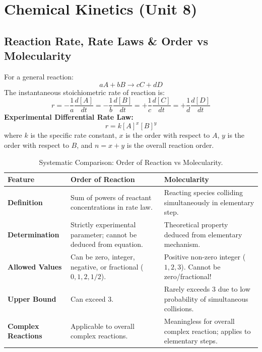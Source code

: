 \documentclass[10pt,twoside,openright]{book}
\begin{document}
\section{Chemical Kinetics (Unit 8)}

\subsection{Reaction Rate, Rate Laws \& Order vs Molecularity}
For a general reaction:
\begin{equation}
  aA + bB \longrightarrow cC + dD
\end{equation}
The instantaneous stoichiometric rate of reaction is:
\begin{equation}
  r = -\frac{1}{a}\frac{d[A]}{dt} = -\frac{1}{b}\frac{d[B]}{dt} = +\frac{1}{c}\frac{d[C]}{dt} = +\frac{1}{d}\frac{d[D]}{dt}
\end{equation}
\textbf{Experimental Differential Rate Law:}
\begin{equation}
  r = k [A]^x [B]^y
\end{equation}
where $k$ is the specific rate constant, $x$ is the order with respect to $A$, $y$ is the order with respect to $B$, and $n = x + y$ is the overall reaction order.

\begin{table}[htbp]
\centering
\footnotesize
\setlength{\tabcolsep}{3pt}
\renewcommand{\arraystretch}{1.2}
\begin{tabularx}{\linewidth}{>{\bfseries}l X X}
\toprule
\textbf{Feature} & \textbf{Order of Reaction} & \textbf{Molecularity} \\
\midrule
Definition & Sum of powers of reactant concentrations in rate law. & Reacting species colliding simultaneously in elementary step. \\
Determination & Strictly experimental parameter; cannot be deduced from equation. & Theoretical property deduced from elementary mechanism. \\
Allowed Values & Can be zero, integer, negative, or fractional ($0, 1, 2, 1/2$). & Positive non-zero integer ($1, 2, 3$). Cannot be zero/fractional! \\
Upper Bound & Can exceed 3. & Rarely exceeds 3 due to low probability of simultaneous collisions. \\
Complex Reactions & Applicable to overall complex reactions. & Meaningless for overall complex reaction; applies to elementary steps. \\
\bottomrule
\end{tabularx}
\caption{Systematic Comparison: Order of Reaction vs Molecularity.}
\end{table}
\end{document}
